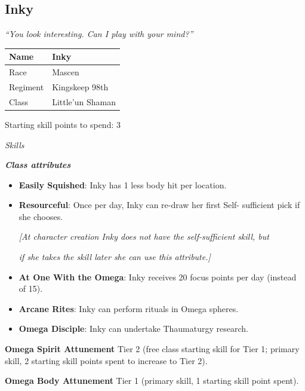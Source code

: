 \subsection{Inky}

\textit{``You look interesting. Can I play with your mind?''}

\begin{table}
\begin{tabular}{|l|l|} \hline 
Name & Inky \\
 \hline Race & Mascen \\
 \hline Regiment & Kingskeep 98th \\
 \hline Class & Little'un Shaman \\
 \hline \end{tabular}

\end{table}

Starting skill points to spend: 3

\textit{Skills}

\textbf{\textit{Class attributes}}

\begin{itemize}
\item \textbf{Easily Squished}: Inky has 1 less body hit per location.

\item \textbf{Resourceful}: Once per day, Inky can re-draw her first Self- sufficient pick if she chooses.

\textit{{[}At character creation Inky does not have the self-sufficient skill, but}

\textit{if she takes the skill later she can use this attribute.{]}}

\item \textbf{At One With the Omega}: Inky receives 20 focus points per day (instead of 15).

\item \textbf{Arcane Rites}: Inky can perform rituals in Omega spheres.

\item \textbf{Omega Disciple}: Inky can undertake Thaumaturgy research.

\end{itemize}
\textbf{Omega Spirit Attunement} Tier 2 (free class starting skill for Tier 1; primary skill, 2 starting skill points spent to increase to Tier 2).

\textbf{Omega Body Attunement} Tier 1 (primary skill, 1 starting skill point spent).

